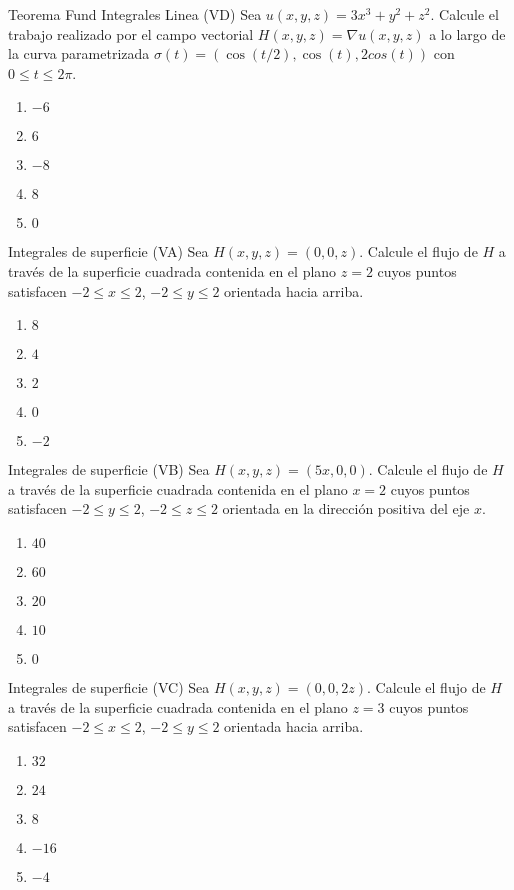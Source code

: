 \documentclass[notheorems]{beamer}
\begin{document}
\begin{frame}{Teorema Fund Integrales Linea (VD)}
Sea $u(x,y,z)=3x^3+y^2+z^2$. Calcule el trabajo realizado por el campo vectorial $H(x,y,z)=\nabla u(x,y,z)$ a lo largo de la curva parametrizada $\sigma(t)=\left(\cos(t/2), \cos(t), 2cos(t)\right)$ con $0\leq t\leq 2\pi$.

\begin{enumerate}
\item $-6$
\item $6$
\item $-8$
\item $8$
\item $0$
\end{enumerate}



\end{frame}


\begin{frame}{Integrales de superficie (VA)}
Sea $H(x,y,z)=(0,0,z)$. Calcule el flujo de $H$ a trav\'es de la superficie cuadrada contenida en el plano $z=2$ cuyos puntos satisfacen $-2\leq x\leq 2$, $-2\leq y\leq 2$ orientada hacia arriba. 

\begin{enumerate}
\item $8$
\item $4$ 
\item $2$
\item $0$
\item $-2$
\end{enumerate}

\end{frame}

\begin{frame}{Integrales de superficie (VB)}
Sea $H(x,y,z)=(5x,0,0)$. Calcule el flujo de $H$ a trav\'es de la superficie cuadrada contenida en el plano $x=2$ cuyos puntos satisfacen $-2\leq y\leq 2$, $-2\leq z\leq 2$ orientada en la direcci\'on positiva del eje $x$. 

\begin{enumerate}
\item $40$
\item $60$ 
\item $20$
\item $10$
\item $0$
\end{enumerate}

\end{frame}
\begin{frame}{Integrales de superficie (VC)}
Sea $H(x,y,z)=(0,0,2z)$. Calcule el flujo de $H$ a trav\'es de la superficie cuadrada contenida en el plano $z=3$ cuyos puntos satisfacen $-2\leq x\leq 2$, $-2\leq y\leq 2$ orientada hacia arriba. 

\begin{enumerate}
\item $32$
\item $24$ 
\item $8$
\item $-16$
\item $-4$
\end{enumerate}

\end{frame}
\end{document}
